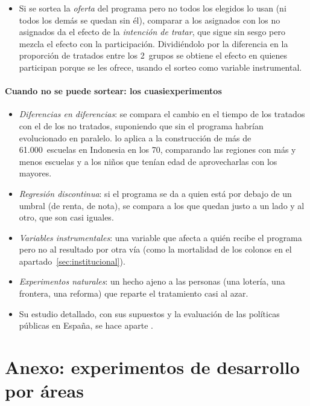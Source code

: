 \documentclass[11pt]{article}
\begin{document}
\begin{itemize}
\item Si se sortea la \emph{oferta} del programa pero no todos los elegidos lo usan (ni todos los demás se quedan sin él), comparar a los asignados con los no asignados da el efecto de la \emph{intención de tratar}, que sigue sin sesgo pero mezcla el efecto con la participación. Dividiéndolo por la diferencia en la proporción de tratados entre los 2~grupos se obtiene el efecto en quienes participan porque se les ofrece, usando el sorteo como variable instrumental\nocite{AngristPischke2009}.
\end{itemize}

\paragraph{Cuando no se puede sortear: los cuasiexperimentos}

\begin{itemize}
\item \emph{Diferencias en diferencias}: se compara el cambio en el tiempo de los tratados con el de los no tratados, suponiendo que sin el programa habrían evolucionado en paralelo. \textcite{Duflo2001} lo aplica a la construcción de más de 61.000~escuelas en Indonesia en los 70, comparando las regiones con más y menos escuelas y a los niños que tenían edad de aprovecharlas con los mayores.
\item \emph{Regresión discontinua}: si el programa se da a quien está por debajo de un umbral (de renta, de nota), se compara a los que quedan justo a un lado y al otro, que son casi iguales.
\item \emph{Variables instrumentales}: una variable que afecta a quién recibe el programa pero no al resultado por otra vía (como la mortalidad de los colonos en el apartado~\ref{sec:institucional}).
\item \emph{Experimentos naturales}: un hecho ajeno a las personas (una lotería, una frontera, una reforma) que reparte el tratamiento casi al azar.
\item Su estudio detallado, con sus supuestos y la evaluación de las políticas públicas en España, se hace aparte .
\end{itemize}

\section{Anexo: experimentos de desarrollo por áreas}\label{anexo:experimentos}
\end{document}
